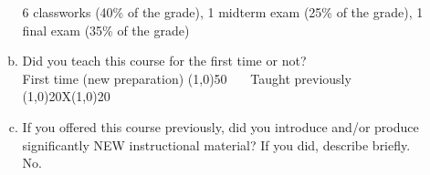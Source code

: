 \begin{enumerate}
\begin{enumerate}[a)]
      6 classworks (40\% of the grade),  1 midterm exam (25\% of the grade), 1 final exam (35\% of the grade) 	 
    \item Did you teach this course for the first time or not? \\
      First time (new preparation) \line(1,0){50}  ~~~Taught previously \line(1,0){20}X\line(1,0){20}
    \item If you offered this course previously, did you introduce and/or produce significantly NEW instructional material? If you did, describe briefly. \\
      No.
    \end{enumerate}
\end{enumerate}
